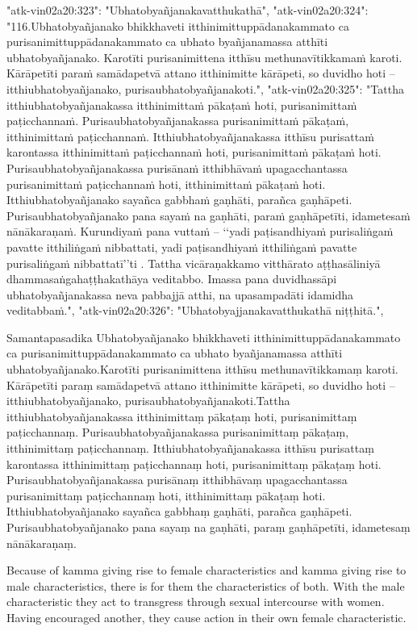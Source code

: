   "atk-vin02a20:323": "Ubhatobyañjanakavatthukathā",
  "atk-vin02a20:324": "116.Ubhatobyañjanako bhikkhaveti itthinimittuppādanakammato ca purisanimittuppādanakammato ca ubhato byañjanamassa atthīti ubhatobyañjanako. Karotīti purisanimittena itthīsu methunavītikkamaṁ karoti. Kārāpetīti paraṁ samādapetvā attano itthinimitte kārāpeti, so duvidho hoti – itthiubhatobyañjanako, purisaubhatobyañjanakoti.",
  "atk-vin02a20:325": "Tattha itthiubhatobyañjanakassa itthinimittaṁ pākaṭaṁ hoti, purisanimittaṁ paṭicchannaṁ. Purisaubhatobyañjanakassa purisanimittaṁ pākaṭaṁ, itthinimittaṁ paṭicchannaṁ. Itthiubhatobyañjanakassa itthīsu purisattaṁ karontassa itthinimittaṁ paṭicchannaṁ hoti, purisanimittaṁ pākaṭaṁ hoti. Purisaubhatobyañjanakassa purisānaṁ itthibhāvaṁ upagacchantassa purisanimittaṁ paṭicchannaṁ hoti, itthinimittaṁ pākaṭaṁ hoti. Itthiubhatobyañjanako sayañca gabbhaṁ gaṇhāti, parañca gaṇhāpeti. Purisaubhatobyañjanako pana sayaṁ na gaṇhāti, paraṁ gaṇhāpetīti, idametesaṁ nānākaraṇaṁ. Kurundiyaṁ pana vuttaṁ – ‘‘yadi paṭisandhiyaṁ purisaliṅgaṁ pavatte itthiliṅgaṁ nibbattati, yadi paṭisandhiyaṁ itthiliṅgaṁ pavatte purisaliṅgaṁ nibbattatī’’ti . Tattha vicāraṇakkamo vitthārato aṭṭhasāliniyā dhammasaṅgahaṭṭhakathāya veditabbo. Imassa pana duvidhassāpi ubhatobyañjanakassa neva pabbajjā atthi, na upasampadāti idamidha veditabbaṁ.",
  "atk-vin02a20:326": "Ubhatobyajjanakavatthukathā niṭṭhitā.",

Samantapasadika
Ubhatobyañjanako bhikkhaveti itthinimittuppādanakammato ca purisanimittuppādanakammato ca ubhato byañjanamassa atthīti ubhatobyañjanako.Karotīti purisanimittena itthīsu methunavītikkamaṃ karoti. Kārāpetīti paraṃ samādapetvā attano itthinimitte kārāpeti, so duvidho hoti – itthiubhatobyañjanako, purisaubhatobyañjanakoti.Tattha itthiubhatobyañjanakassa itthinimittaṃ pākaṭaṃ hoti, purisanimittaṃ paṭicchannaṃ. Purisaubhatobyañjanakassa purisanimittaṃ pākaṭaṃ, itthinimittaṃ paṭicchannaṃ. Itthiubhatobyañjanakassa itthīsu purisattaṃ karontassa itthinimittaṃ paṭicchannaṃ hoti, purisanimittaṃ pākaṭaṃ hoti. Purisaubhatobyañjanakassa purisānaṃ itthibhāvaṃ upagacchantassa purisanimittaṃ paṭicchannaṃ hoti, itthinimittaṃ pākaṭaṃ hoti. Itthiubhatobyañjanako sayañca gabbhaṃ gaṇhāti, parañca gaṇhāpeti. Purisaubhatobyañjanako pana sayaṃ na gaṇhāti, paraṃ gaṇhāpetīti, idametesaṃ nānākaraṇaṃ. 

Because of kamma giving rise to female characteristics and kamma giving rise to male characteristics, there is for them the characteristics of both. With the male characteristic they act to transgress through sexual intercourse with women. Having encouraged another, they cause action in their own female characteristic. 

